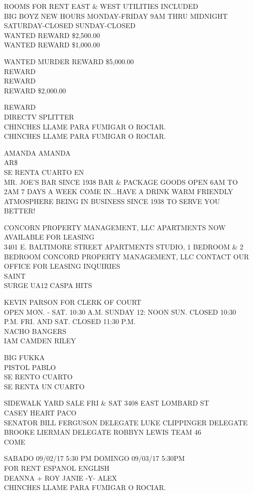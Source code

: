 \documentclass[10pt,letterpaper]{article}
\begin{document}
ROOMS FOR RENT EAST \& WEST UTILITIES INCLUDED\\
BIG BOYZ NEW HOURS MONDAY{-}FRIDAY 9AM THRU MIDNIGHT SATURDAY{-}CLOSED SUNDAY{-}CLOSED\\
WANTED REWARD \$2,500.00\\
WANTED REWARD \$1,000.00

WANTED MURDER REWARD \$5,000.00\\
REWARD\\
REWARD\\
REWARD \$2,000.00

REWARD\\
DIRECTV SPLITTER\\
CHINCHES LLAME PARA FUMIGAR O ROCIAR.\\
CHINCHES LLAME PARA FUMIGAR O ROCIAR.

AMANDA AMANDA\\
AR\$\\
SE RENTA CUARTO EN\\
MR. JOE'S BAR SINCE 1938 BAR \& PACKAGE GOODS OPEN 6AM TO 2AM 7 DAYS A WEEK COME IN...HAVE A DRINK WARM FRIENDLY ATMOSPHERE BEING IN BUSINESS SINCE 1938 TO SERVE YOU BETTER!

CONCORN PROPERTY MANAGEMENT, LLC APARTMENTS NOW AVAILABLE FOR LEASING\\
3401 E. BALTIMORE STREET APARTMENTS STUDIO, 1 BEDROOM \& 2 BEDROOM CONCORD PROPERTY MANAGEMENT, LLC CONTACT OUR OFFICE FOR LEASING INQUIRIES\\
SAINT\\
SURGE UA12 CASPA HITS

KEVIN PARSON FOR CLERK OF COURT\\
OPEN MON. {-} SAT. 10:30 A.M. SUNDAY 12: NOON SUN. CLOSED 10:30 P.M. FRI. AND SAT. CLOSED 11:30 P.M.\\
NACHO BANGERS\\
IAM CAMDEN RILEY

BIG FUKKA\\
PISTOL PABLO\\
SE RENTO CUARTO\\
SE RENTA UN CUARTO

SIDEWALK YARD SALE FRI \& SAT 3408 EAST LOMBARD ST\\
CASEY HEART PACO\\
SENATOR BILL FERGUSON DELEGATE LUKE CLIPPINGER DELEGATE BROOKE LIERMAN DELEGATE ROBBYN LEWIS TEAM 46\\
COME

SABADO 09/02/17 5:30 PM DOMINGO 09/03/17 5:30PM\\
FOR RENT ESPANOL ENGLISH\\
DEANNA + ROY JANIE {-}Y{-} ALEX\\
CHINCHES LLAME PARA FUMIGAR O ROCIAR.
\end{document}
